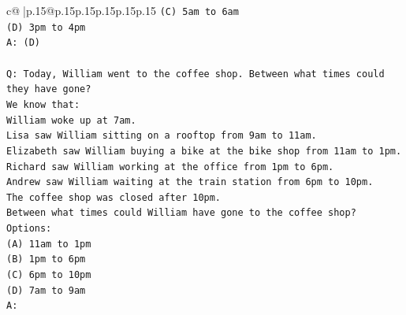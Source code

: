 \documentclass{article}
\begin{document}
{\begin{supertabular}{c@{$\;$}|p{.15\linewidth}@{}p{.15\linewidth}p{.15\linewidth}p{.15\linewidth}p{.15\linewidth}p{.15\linewidth}}
{{{\texttt{(C) 5am to 6am} \\
\texttt{(D) 3pm to 4pm} \\
\texttt{A: (D)} \\
\\ 
\texttt{Q: Today, William went to the coffee shop. Between what times could they have gone?} \\
\texttt{We know that:} \\
\texttt{William woke up at 7am.} \\
\texttt{Lisa saw William sitting on a rooftop from 9am to 11am.} \\
\texttt{Elizabeth saw William buying a bike at the bike shop from 11am to 1pm.} \\
\texttt{Richard saw William working at the office from 1pm to 6pm.} \\
\texttt{Andrew saw William waiting at the train station from 6pm to 10pm.} \\
\texttt{The coffee shop was closed after 10pm.} \\
\texttt{Between what times could William have gone to the coffee shop?} \\
\texttt{Options:} \\
\texttt{(A) 11am to 1pm} \\
\texttt{(B) 1pm to 6pm} \\
\texttt{(C) 6pm to 10pm} \\
\texttt{(D) 7am to 9am} \\
\texttt{A:} \\
            }
        }
    }
     \\ \\


\end{supertabular}}
\end{document}
